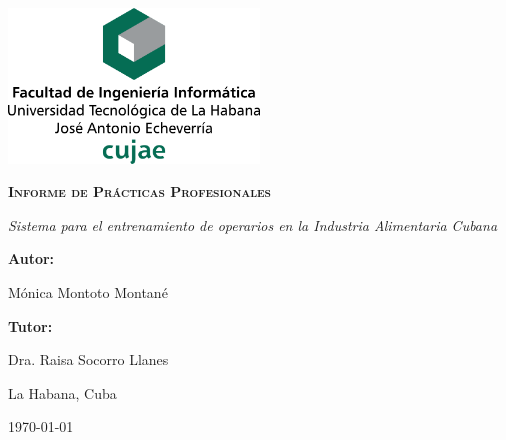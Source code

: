 \begin{titlepage}

\centering

{\includegraphics[width=0.5\textwidth]{imagen/cujae}\par}

\vspace{4cm}

{\bfseries\scshape\huge Informe de Prácticas Profesionales \par}
\vspace{1cm}

{\itshape\Large Sistema para el entrenamiento de operarios en la Industria Alimentaria Cubana \par}
\vspace{4cm}

{\bfseries\Large Autor:} { \Large Mónica Montoto Montané \par}
{\bfseries\Large Tutor: }{\Large Dra. Raisa Socorro Llanes \par}
\vfill

{\Large La Habana, Cuba \par}

\small{\mifecha\today}

\end{titlepage}


